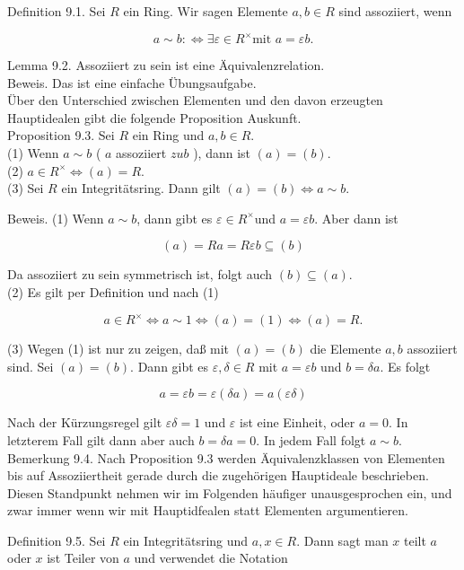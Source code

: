 \documentclass[10pt, letterpaper]{article}
\begin{document}
Definition 9.1. Sei $R$ ein Ring. Wir sagen Elemente $a, b \in R$ sind assoziiert, wenn

$$
a \sim b: \Longleftrightarrow \exists \varepsilon \in R^{\times} \text {mit } a=\varepsilon b .
$$

Lemma 9.2. Assoziiert zu sein ist eine Äquivalenzrelation.\\
Beweis. Das ist eine einfache Übungsaufgabe.\\
Über den Unterschied zwischen Elementen und den davon erzeugten Hauptidealen gibt die folgende Proposition Auskunft.\\
Proposition 9.3. Sei $R$ ein Ring und $a, b \in R$.\\
(1) Wenn $a \sim b$ ( $a$ assoziiert $z u b$ ), dann ist $(a)=(b)$.\\
(2) $a \in R^{\times} \Longleftrightarrow(a)=R$.\\
(3) Sei $R$ ein Integritätsring. Dann gilt $(a)=(b) \Longleftrightarrow a \sim b$.

Beweis. (1) Wenn $a \sim b$, dann gibt es $\varepsilon \in R^{\times}$und $a=\varepsilon b$. Aber dann ist

$$
(a)=R a=R \varepsilon b \subseteq(b)
$$

Da assoziiert zu sein symmetrisch ist, folgt auch $(b) \subseteq(a)$.\\
(2) Es gilt per Definition und nach (1)

$$
a \in R^{\times} \Longleftrightarrow a \sim 1 \Longleftrightarrow(a)=(1) \Longleftrightarrow(a)=R .
$$

(3) Wegen (1) ist nur zu zeigen, daß mit $(a)=(b)$ die Elemente $a, b$ assoziiert sind. Sei $(a)=(b)$. Dann gibt es $\varepsilon, \delta \in R$ mit $a=\varepsilon b$ und $b=\delta a$. Es folgt

$$
a=\varepsilon b=\varepsilon(\delta a)=a(\varepsilon \delta)
$$

Nach der Kürzungsregel gilt $\varepsilon \delta=1$ und $\varepsilon$ ist eine Einheit, oder $a=0$. In letzterem Fall gilt dann aber auch $b=\delta a=0$. In jedem Fall folgt $a \sim b$.\\
Bemerkung 9.4. Nach Proposition 9.3 werden Äquivalenzklassen von Elementen bis auf Assoziiertheit gerade durch die zugehörigen Hauptideale beschrieben. Diesen Standpunkt nehmen wir im Folgenden häufiger unausgesprochen ein, und zwar immer wenn wir mit Hauptidfealen statt Elementen argumentieren.

Definition 9.5. Sei $R$ ein Integritätsring und $a, x \in R$. Dann sagt man $x$ teilt $a$ oder $x$ ist Teiler von $a$ und verwendet die Notation
\end{document}
